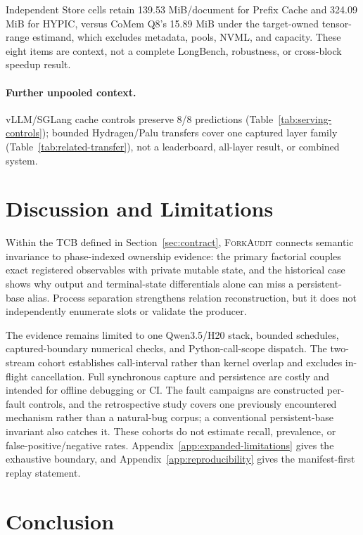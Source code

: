 \documentclass{article}
\newcommand{\method}{\textsc{ForkAudit}}
\begin{document}

\FloatBarrier

Independent Store cells retain 139.53 MiB/document for Prefix Cache and 324.09
MiB for HYPIC, versus CoMem Q8's 15.89 MiB under the target-owned tensor-range
estimand, which excludes metadata, pools, NVML, and capacity.  These eight
items are context, not a complete LongBench, robustness, or cross-block speedup
result.

\paragraph{Further unpooled context.}
vLLM/SGLang cache controls preserve 8/8 predictions
(Table~\ref{tab:serving-controls}); bounded Hydragen/Palu transfers cover one
captured layer family (Table~\ref{tab:related-transfer}), not a leaderboard,
all-layer result, or combined system.

\section{Discussion and Limitations}
\label{sec:limitations}

Within the TCB defined in Section~\ref{sec:contract}, \method{} connects
semantic invariance to phase-indexed ownership evidence: the primary factorial couples exact registered
observables with private mutable state, and the historical case shows why
output and terminal-state differentials alone can miss a persistent-base
alias.  Process separation strengthens relation reconstruction, but it does
not independently enumerate slots or validate the producer.

The evidence remains limited to one Qwen3.5/H20 stack, bounded schedules,
captured-boundary numerical checks, and Python-call-scope dispatch.  The
two-stream cohort establishes call-interval rather than kernel overlap and
excludes in-flight cancellation.  Full synchronous capture and persistence
are costly and intended for offline debugging or CI.  The fault campaigns are
constructed per-fault controls, and the retrospective study covers one
previously encountered mechanism rather than a natural-bug corpus; a
conventional persistent-base invariant also catches it.  These cohorts do not
estimate recall, prevalence, or false-positive/negative rates.
Appendix~\ref{app:expanded-limitations} gives the exhaustive boundary, and
Appendix~\ref{app:reproducibility} gives the manifest-first replay statement.

\section{Conclusion}
\end{document}
